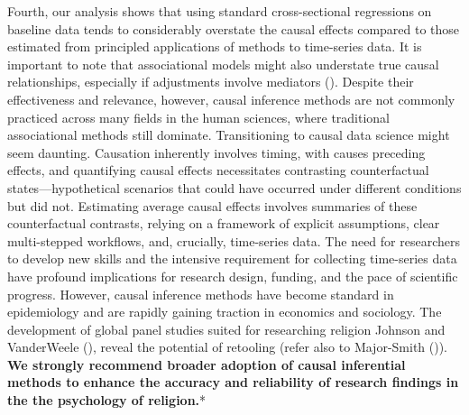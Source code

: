 \documentclass[
  single column]{article}
\begin{document}
Fourth, our analysis shows that using standard cross-sectional
regressions on baseline data tends to considerably overstate the causal
effects compared to those estimated from principled applications of
methods to time-series data. It is important to note that associational
models might also understate true causal relationships, especially if
adjustments involve mediators (). Despite their effectiveness and relevance,
however, causal inference methods are not commonly practiced across many
fields in the human sciences, where traditional associational methods
still dominate. Transitioning to causal data science might seem
daunting. Causation inherently involves timing, with causes preceding
effects, and quantifying causal effects necessitates contrasting
counterfactual states---hypothetical scenarios that could have occurred
under different conditions but did not. Estimating average causal
effects involves summaries of these counterfactual contrasts, relying on
a framework of explicit assumptions, clear multi-stepped workflows, and,
crucially, time-series data. The need for researchers to develop new
skills and the intensive requirement for collecting time-series data
have profound implications for research design, funding, and the pace of
scientific progress. However, causal inference methods have become
standard in epidemiology and are rapidly gaining traction in economics
and sociology. The development of global panel studies suited for
researching religion Johnson and VanderWeele
(), reveal the potential of
retooling (refer also to Major-Smith
()). \textbf{We strongly
recommend broader adoption of causal inferential methods to enhance the
accuracy and reliability of research findings in the the psychology of
religion.}*
\end{document}
